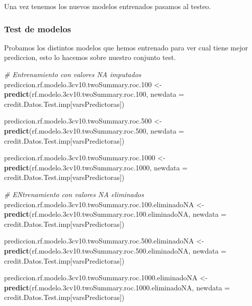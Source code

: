 \documentclass[
]{article}
\newenvironment{Shaded}{\begin{snugshade}}{\end{snugshade}}
\newcommand{\AttributeTok}[1]{\textcolor[rgb]{0.13,0.29,0.53}{#1}}
\newcommand{\CommentTok}[1]{\textcolor[rgb]{0.56,0.35,0.01}{\textit{#1}}}
\newcommand{\FloatTok}[1]{\textcolor[rgb]{0.00,0.00,0.81}{#1}}
\newcommand{\FunctionTok}[1]{\textcolor[rgb]{0.13,0.29,0.53}{\textbf{#1}}}
\newcommand{\NormalTok}[1]{#1}
\newcommand{\OtherTok}[1]{\textcolor[rgb]{0.56,0.35,0.01}{#1}}
\begin{document}
Una vez tenemos los nuevos modelos entrenados pasamos al testeo.

\hypertarget{test-de-modelos}{%
\subsubsection{Test de modelos}\label{test-de-modelos}}

Probamos los distintos modelos que hemos entrenado para ver cual tiene
mejor prediccion, esto lo hacemos sobre nuestro conjunto test.

\begin{Shaded}
\begin{Highlighting}[]
\CommentTok{\# Entrenamiento con valores NA imputados}
\NormalTok{prediccion.rf.modelo}\FloatTok{.3}\NormalTok{cv10.twoSummary.roc}\FloatTok{.100} \OtherTok{\textless{}{-}} \FunctionTok{predict}\NormalTok{(rf.modelo}\FloatTok{.3}\NormalTok{cv10.twoSummary.roc}\FloatTok{.100}\NormalTok{, }\AttributeTok{newdata =}\NormalTok{ credit.Datos.Test.imp[varsPredictoras])}

\NormalTok{prediccion.rf.modelo}\FloatTok{.3}\NormalTok{cv10.twoSummary.roc}\FloatTok{.500} \OtherTok{\textless{}{-}} \FunctionTok{predict}\NormalTok{(rf.modelo}\FloatTok{.3}\NormalTok{cv10.twoSummary.roc}\FloatTok{.500}\NormalTok{, }\AttributeTok{newdata =}\NormalTok{ credit.Datos.Test.imp[varsPredictoras])}

\NormalTok{prediccion.rf.modelo}\FloatTok{.3}\NormalTok{cv10.twoSummary.roc}\FloatTok{.1000} \OtherTok{\textless{}{-}} \FunctionTok{predict}\NormalTok{(rf.modelo}\FloatTok{.3}\NormalTok{cv10.twoSummary.roc}\FloatTok{.1000}\NormalTok{, }\AttributeTok{newdata =}\NormalTok{ credit.Datos.Test.imp[varsPredictoras])}

\CommentTok{\# ENtrenamiento con valores NA eliminados}
\NormalTok{prediccion.rf.modelo}\FloatTok{.3}\NormalTok{cv10.twoSummary.roc.}\FloatTok{100.}\NormalTok{eliminadoNA }\OtherTok{\textless{}{-}} \FunctionTok{predict}\NormalTok{(rf.modelo}\FloatTok{.3}\NormalTok{cv10.twoSummary.roc.}\FloatTok{100.}\NormalTok{eliminadoNA, }\AttributeTok{newdata =}\NormalTok{ credit.Datos.Test.imp[varsPredictoras])}

\NormalTok{prediccion.rf.modelo}\FloatTok{.3}\NormalTok{cv10.twoSummary.roc.}\FloatTok{500.}\NormalTok{eliminadoNA }\OtherTok{\textless{}{-}} \FunctionTok{predict}\NormalTok{(rf.modelo}\FloatTok{.3}\NormalTok{cv10.twoSummary.roc.}\FloatTok{500.}\NormalTok{eliminadoNA, }\AttributeTok{newdata =}\NormalTok{ credit.Datos.Test.imp[varsPredictoras])}

\NormalTok{prediccion.rf.modelo}\FloatTok{.3}\NormalTok{cv10.twoSummary.roc.}\FloatTok{1000.}\NormalTok{eliminadoNA }\OtherTok{\textless{}{-}} \FunctionTok{predict}\NormalTok{(rf.modelo}\FloatTok{.3}\NormalTok{cv10.twoSummary.roc.}\FloatTok{1000.}\NormalTok{eliminadoNA, }\AttributeTok{newdata =}\NormalTok{ credit.Datos.Test.imp[varsPredictoras])}
\end{Highlighting}
\end{Shaded}
\end{document}
